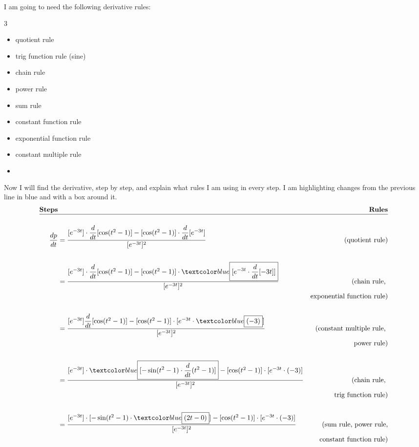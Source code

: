I am going to need the following derivative rules:
\begin{multicols}{3}
	\begin{itemize}
		\item quotient rule
		\item trig function rule (sine)
		\item chain rule
		\item power rule
		\item sum rule
		\item constant function rule
		\item exponential function rule
		\item constant multiple rule
		\item[]
	\end{itemize}
\end{multicols}
Now I will find the derivative, step by step, and 
explain what rules I am using in every step.
I am highlighting changes from the previous line in blue and with a box around it.
\begin{align*}
	\everymath{\displaystyle}
\textbf{Steps}& 
& \textbf{Rules} \\\hline
&&\\
\frac{dp}{dt} &= \frac{[e^{-3t}]\cdot \ddiff{t}[\cos(t^2-1)] - 
					   [\cos(t^2-1)]\cdot \ddiff{t}[e^{-3t}]}
					  {[e^{-3t}]^2}
& \textrm{(quotient rule)} \\ \\
&= \frac{[e^{-3t}] \cdot \ddiff{t}[\cos(t^2-1)] - 
         [\cos(t^2-1)]\cdot
         \blue{[e^{-3t}\cdot\ddiff{t}[-3t]]}}
		{[e^{-3t}]^2} 
& \textrm{(chain rule, } \\ 
&& \textrm{exponential function rule)} \\ \\
&= \frac{[e^{-3t}] \ddiff{t}[\cos(t^2-1)] - 
         [\cos(t^2-1)]\cdot 
		 [e^{-3t}\cdot\blue{(-3)}]}
		{[e^{-3t}]^2} 
& \textrm{(constant multiple rule, } \\
&& \textrm{power rule)} \\ \\
&= \frac{[e^{-3t}] \cdot
         \blue{[-\sin(t^2-1)\cdot\ddiff{t}(t^2-1)]} - 
		 [\cos(t^2-1)]\cdot 
         [e^{-3t}\cdot(-3)]}
		{[e^{-3t}]^2}
& \textrm{(chain rule, } \\
&& \textrm{trig function rule)} \\ \\
&= \frac{[e^{-3t}] \cdot
         [-\sin(t^2-1)\cdot \blue{(2t-0)}] - 
		 [\cos(t^2-1)]\cdot 
         [e^{-3t}\cdot(-3)]}
		{[e^{-3t}]^2}
& \textrm{(sum rule, power rule,} \\
&& \textrm{constant function rule)}
\end{align*}

